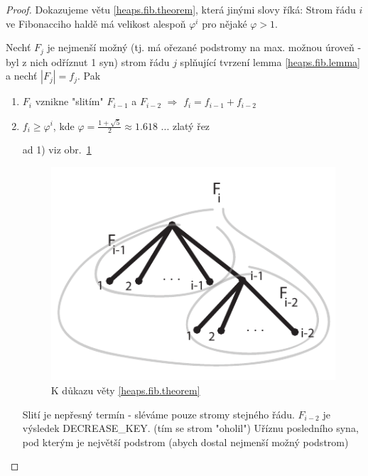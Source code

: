 \begin{proof}
Dokazujeme větu \ref{heaps.fib.theorem}, která jinými slovy říká: 
Strom řádu $i$ ve
Fibonacciho haldě má velikost alespoň $\varphi^i$ pro nějaké $\varphi >
1$.

Nechť $F_j$ je nejmenší možný (tj. má ořezané podstromy na max. možnou
úroveň - byl z nich odříznut 1 syn) strom řádu $j$ splňující tvrzení lemma
\ref{heaps.fib.lemma} a nechť $|F_j| = f_j$. Pak

\begin{enumerate}
  \item $F_i$ vznikne "slitím" $F_{i-1}$ a $F_{i-2}$ $\Rightarrow$ 
  	$f_i = f_{i-1} + f_{i-2}$
  \item $f_i \geq \varphi^i$, kde 
  	$\varphi = \frac{1+\sqrt 5}{2} \approx 1.618$ ... zlatý řez
\end{enumerate}

\begin{itemize}
  \item[ad 1)] 
  viz obr.~\ref{fig:heaps.fib.proof}

  \begin{figure} 
  \centering\includegraphics{pics/fibheap}
  \caption{K důkazu věty \ref{heaps.fib.theorem}}
  \label{fig:heaps.fib.proof}
  \end{figure}

  Slití je nepřesný termín - sléváme pouze stromy stejného řádu.
  $F_{i-2}$ je výsledek DECREASE\_KEY. (tím se strom "oholil") Uříznu
  posledního syna, pod kterým je největší podstrom (abych dostal nejmenší
  možný podstrom)


\end{itemize}
\end{proof}
